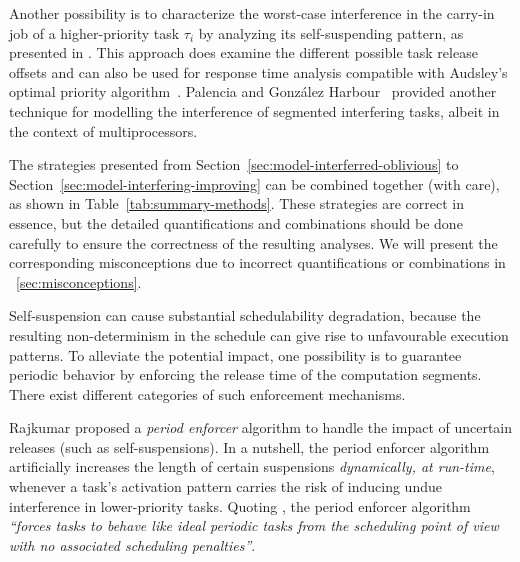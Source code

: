 Another possibility is to characterize the worst-case interference in the carry-in job of a higher-priority task $\tau_i$ by analyzing 
its self-suspending pattern, as presented in \cite{Huang:multiseg}. This approach does examine the different possible task release offsets
and can also be used for response time analysis compatible with Audsley's optimal priority algorithm~\cite{Audsley1991aOPA}.
Palencia and Gonz\'alez Harbour~\cite{PH:rtss98} provided another technique for modelling the interference of segmented interfering tasks, 
albeit in the context of multiprocessors. %



The strategies presented from Section~\ref{sec:model-interferred-oblivious} to Section~\ref{sec:model-interfering-improving} can be combined together (with care), as shown in Table~\ref{tab:summary-methods}.  These strategies are correct in essence, but the detailed quantifications and combinations should be done carefully to ensure the correctness of the resulting analyses. We will present the corresponding misconceptions due to incorrect quantifications or combinations in \mysectionref{}~\ref{sec:misconceptions}.

\label{sec:release-enforce}

Self-suspension can cause substantial schedulability degradation, because the resulting non-determinism in the schedule can give rise 
to unfavourable execution patterns. To alleviate the potential impact, one possibility is to guarantee periodic behavior by 
enforcing the release time of the computation segments. There exist different categories of such enforcement mechanisms. 


\label{sec:period-enforce}

Rajkumar \cite{Raj:suspension1991} proposed a \emph{period enforcer} 
algorithm to handle the impact of uncertain releases (such as self-suspensions). In a nutshell, the period enforcer algorithm artificially 
increases the length of certain suspensions \emph{dynamically, at run-time},
whenever a task's activation pattern carries the risk of inducing undue interference in 
lower-priority tasks. Quoting \cite{Raj:suspension1991}, the period enforcer algorithm \textit{``forces tasks to behave like ideal 
periodic tasks from the scheduling point of view with no associated scheduling penalties''}. 

